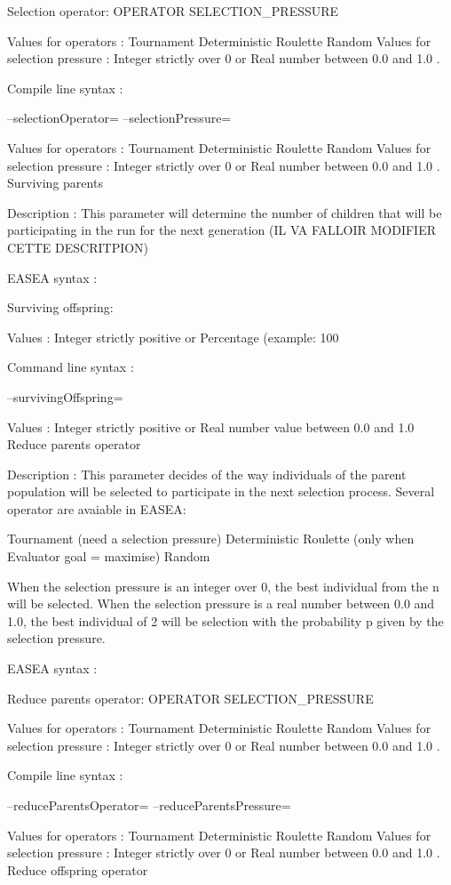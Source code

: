 \documentclass{article}
\begin{document}
Selection operator: OPERATOR SELECTION_PRESSURE

Values for operators : Tournament Deterministic Roulette Random
Values for selection pressure : Integer strictly over 0 or Real number between 0.0 and 1.0 .

Compile line syntax :

--selectionOperator=
--selectionPressure=

Values for operators : Tournament Deterministic Roulette Random
Values for selection pressure : Integer strictly over 0 or Real number between 0.0 and 1.0 .
Surviving parents

Description :
This parameter will determine the number of children that will be participating in the run for the next generation (IL VA FALLOIR MODIFIER CETTE DESCRITPION)

EASEA syntax :

Surviving offspring:

Values : Integer strictly positive or Percentage (example: 100%

Command line syntax :

--survivingOffspring=

Values : Integer strictly positive or Real number value between 0.0 and 1.0
Reduce parents operator

Description :
This parameter decides of the way individuals of the parent population will be selected to participate in the next selection process. Several operator are avaiable in EASEA:

    Tournament (need a selection pressure)
    Deterministic
    Roulette (only when Evaluator goal = maximise)
    Random 

When the selection pressure is an integer over 0, the best individual from the n will be selected.
When the selection pressure is a real number between 0.0 and 1.0, the best individual of 2 will be selection with the probability p given by the selection pressure.

EASEA syntax :

Reduce parents operator: OPERATOR SELECTION_PRESSURE

Values for operators : Tournament Deterministic Roulette Random
Values for selection pressure : Integer strictly over 0 or Real number between 0.0 and 1.0 .

Compile line syntax :

--reduceParentsOperator=
--reduceParentsPressure=

Values for operators : Tournament Deterministic Roulette Random
Values for selection pressure : Integer strictly over 0 or Real number between 0.0 and 1.0 .
Reduce offspring operator
\end{document}
